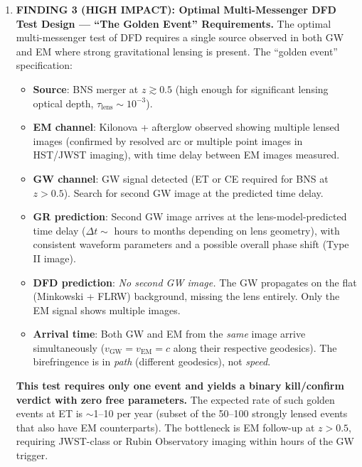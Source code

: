\documentclass[11pt]{article}
\theoremstyle{definition}
\theoremstyle{remark}
\begin{document}
\begin{tcolorbox}[colback=blue!5!white, colframe=blue!60!black,
  title=\textbf{TOP 5 FINDINGS --- W4i17 P6 (Ranked by Impact)}]
\begin{enumerate}[nosep]
\item \textbf{FINDING 3 (HIGH IMPACT): Optimal Multi-Messenger DFD
  Test Design --- ``The Golden Event'' Requirements.}
  The optimal multi-messenger test of DFD requires a single source
  observed in both GW and EM where strong gravitational lensing is
  present. The ``golden event'' specification:
  \begin{itemize}[nosep]
  \item \textbf{Source}: BNS merger at $z \gtrsim 0.5$ (high enough
    for significant lensing optical depth, $\tau_{\mathrm{lens}}
    \sim 10^{-3}$).
  \item \textbf{EM channel}: Kilonova + afterglow observed showing
    multiple lensed images (confirmed by resolved arc or multiple
    point images in HST/JWST imaging), with time delay between EM
    images measured.
  \item \textbf{GW channel}: GW signal detected (ET or CE required for
    BNS at $z > 0.5$). Search for second GW image at the predicted
    time delay.
  \item \textbf{GR prediction}: Second GW image arrives at the
    lens-model-predicted time delay ($\Delta t \sim$ hours to months
    depending on lens geometry), with consistent waveform parameters
    and a possible overall phase shift (Type II image).
  \item \textbf{DFD prediction}: \emph{No second GW image.} The GW
    propagates on the flat (Minkowski + FLRW) background, missing the
    lens entirely. Only the EM signal shows multiple images.
  \item \textbf{Arrival time}: Both GW and EM from the \emph{same}
    image arrive simultaneously ($v_{\mathrm{GW}} = v_{\mathrm{EM}} = c$
    along their respective geodesics). The birefringence is in
    \emph{path} (different geodesics), not \emph{speed}.
  \end{itemize}
  \textbf{This test requires only one event and yields a binary
  kill/confirm verdict with zero free parameters.}
  The expected rate of such golden events at ET is $\sim$1--10 per year
  (subset of the 50--100 strongly lensed events that also have EM
  counterparts). The bottleneck is EM follow-up at $z > 0.5$, requiring
  JWST-class or Rubin Observatory imaging within hours of the GW trigger.


\end{enumerate}
\end{tcolorbox}
\end{document}

